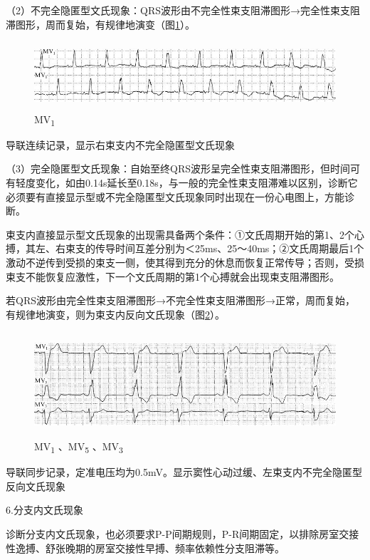 （2）不完全隐匿型文氏现象：QRS波形由不完全性束支阻滞图形→完全性束支阻滞图形，周而复始，有规律地演变（图\ref{fig18-8}）。

\begin{figure}[!htbp]
 \centering
 \includegraphics[width=5.58333in,height=0.98958in]{./images/Image00309.jpg}
 \captionsetup{justification=centering}
 \caption{MV\textsubscript{1}}
 \label{fig18-8}
  \end{figure} 
导联连续记录，显示右束支内不完全隐匿型文氏现象

（3）完全隐匿型文氏现象：自始至终QRS波形呈完全性束支阻滞图形，但时间可有轻度变化，如由0.14s延长至0.18s，与一般的完全性束支阻滞难以区别，诊断它必须要有直接显示型或不完全隐匿型文氏现象同时出现在一份心电图上，方能诊断。

束支内直接显示型文氏现象的出现需具备两个条件：①文氏周期开始的第1、2个心搏，其左、右束支的传导时间互差分别为＜25ms、25～40ms；②文氏周期最后1个激动不逆传到受损的束支一侧，使其得到充分的休息而恢复正常传导；否则，受损束支不能恢复应激性，下一个文氏周期的第1个心搏就会出现束支阻滞图形。

若QRS波形由完全性束支阻滞图形→不完全性束支阻滞图形→正常，周而复始，有规律地演变，则为束支内反向文氏现象（图\ref{fig18-9}）。

\begin{figure}[!htbp]
 \centering
 \includegraphics[width=5.58333in,height=1.53125in]{./images/Image00310.jpg}
 \captionsetup{justification=centering}
 \caption{MV\textsubscript{1} 、MV\textsubscript{5} 、MV\textsubscript{3}}
 \label{fig18-9}
  \end{figure} 
导联同步记录，定准电压均为0.5mV。显示窦性心动过缓、左束支内不完全隐匿型反向文氏现象

6.分支内文氏现象

诊断分支内文氏现象，也必须要求P-P间期规则，P-R间期固定，以排除房室交接性逸搏、舒张晚期的房室交接性早搏、频率依赖性分支阻滞等。

